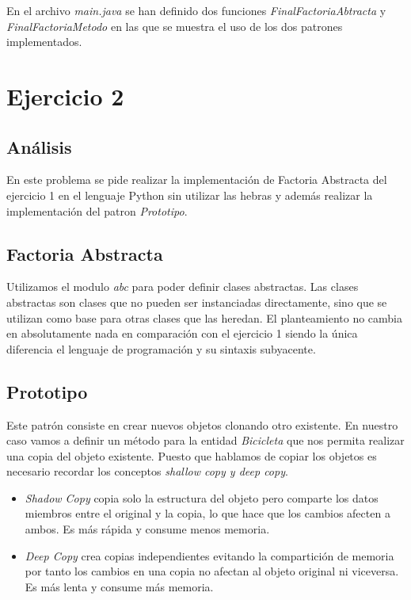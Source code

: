 \documentclass{article}
\begin{document}
En el archivo \textit{main.java} se han definido dos funciones \textit{FinalFactoriaAbtracta} y \textit{FinalFactoriaMetodo}
en las que se muestra el uso de los dos patrones implementados. 	


\section{Ejercicio 2}
\subsection{Análisis}
En este problema se pide realizar la implementación de Factoria Abstracta del ejercicio 1 en el lenguaje Python sin utilizar las hebras y además realizar la implementación del patron \textit{Prototipo}. 

\subsection{Factoria Abstracta}
Utilizamos el modulo \textit{abc} para poder definir clases abstractas. Las clases abstractas son clases que no pueden ser instanciadas directamente, sino que se utilizan como base para otras clases que las heredan. 
El planteamiento no cambia en absolutamente nada en comparación con el ejercicio 1 siendo la única diferencia el lenguaje de programación y su sintaxis subyacente.

\subsection{Prototipo}
Este patrón consiste en crear nuevos objetos clonando otro existente. En nuestro caso vamos a definir un método para la entidad \textit{Bicicleta} que nos permita realizar una copia del objeto existente. Puesto que hablamos de copiar los objetos es necesario recordar los conceptos \textit{shallow copy y deep copy}. 

\begin{itemize}
	\item \textit{Shadow Copy}  copia solo la estructura  del objeto pero comparte los datos miembros entre el original y la copia, lo que hace que los cambios afecten a ambos. Es más rápida y consume menos memoria.
	
	\item \textit{Deep Copy }crea copias independientes evitando la compartición de memoria por tanto los cambios en una copia no afectan al objeto original ni viceversa. Es más lenta y consume más memoria.
\end{itemize}
\end{document}
